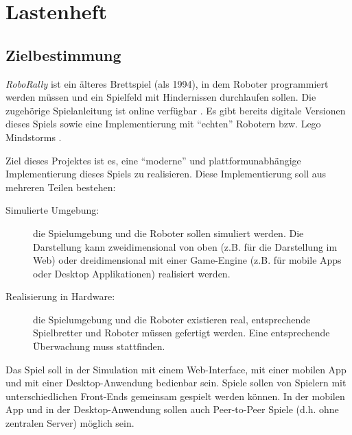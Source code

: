 
\part{Lastenheft}



\chapter{Zielbestimmung}

\emph{RoboRally} ist ein älteres Brettspiel (als 1994), in dem Roboter programmiert werden müssen und ein Spielfeld mit Hindernissen durchlaufen sollen.
Die zugehörige Spielanleitung ist online verfügbar \cite{roborally_rulebook}.
Es gibt bereits digitale Versionen dieses Spiels \cite{roborally_java} sowie eine Implementierung mit \enquote{echten} Robotern  \cite{make_roborally, roboruckus_git, roboruckus_web} bzw. Lego Mindstorms \cite{super_robo_rally}.

Ziel dieses Projektes ist es, eine \enquote{moderne} und plattformunabhängige Implementierung dieses Spiels zu realisieren. Diese Implementierung soll aus mehreren Teilen bestehen:

\begin{description}
    \item[Simulierte Umgebung:] die Spielumgebung und die Roboter sollen simuliert werden.
    Die Darstellung kann zweidimensional von oben (z.B. für die Darstellung im Web) oder dreidimensional mit einer Game-Engine (z.B. für mobile Apps oder Desktop Applikationen) realisiert werden.

    \item[Realisierung in Hardware:] die Spielumgebung und die Roboter existieren real, entsprechende Spielbretter und Roboter müssen gefertigt werden.
    Eine entsprechende Überwachung muss stattfinden.
\end{description}

Das Spiel soll in der Simulation mit einem Web-Interface, mit einer mobilen App und mit einer Desktop-Anwendung bedienbar sein.
Spiele sollen von Spielern mit unterschiedlichen Front-Ends gemeinsam gespielt werden können.
In der mobilen App und in der Desktop-Anwendung sollen auch Peer-to-Peer Spiele (d.h. ohne zentralen Server) möglich sein.

